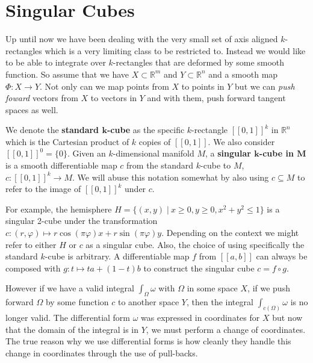 \section{Singular Cubes}

Up until now we have been dealing with the very small set of axis aligned $k$-rectangles 
which is a very limiting class to be restricted to.
Instead we would like to be able to integrate over $k$-rectangles that are deformed by some smooth function.
So assume that we have $X \subset \mathbb{R}^m$ and $Y \subset \mathbb{R}^n$ and a smooth map 
 $\varPhi : X \to Y$.
Not only can we map points from $X$ to points in $Y$ but we can \emph{push foward} vectors from $X$ to vectors in $Y$
and with them, push forward tangent spaces as well.


\begin{definition}
	We denote the \textbf{standard $\boldsymbol{k}$-cube} as the specific $k$-rectangle $[\![0,1]\!]^k$ in 	
	$\mathbb{R}^n$ which is the Cartesian product of $k$ copies of $[\![0,1]\!]$.
	We also consider $[\![0,1]\!]^0 = \{0\}$.
	Given an $k$-dimensional manifold $M$, a \textbf{singular $\boldsymbol{k}$-cube in $\boldsymbol{M}$} is a 
	smooth differentiable map $c$ from the standard $k$-cube to $M$, $c:[\![0,1]\!]^k \to M$.
	We will abuse this notation somewhat by also using $c \subseteq M$ to refer to the image of $[\![0,1]\!]^k$ under $c$.
\end{definition}

For example, the hemisphere $H = \{ (x,y) \; | \: x \geq 0, y\geq 0, x^2+y^2 \leq 1 \}$
is a singular 2-cube under the transformation $c: (r, \varphi) \mapsto r \cos(\pi \varphi) x+ r \sin(\pi \varphi) y$.
Depending on the context we might refer to either $H$ or $c$ as a singular cube.
Also, the choice of using specifically the standard $k$-cube is arbitrary.
A differentiable map $f$ from $[\![a,b]\!]$ can always be composed with $g:t \mapsto ta +(1-t)b$ 
to construct the singular cube $c=f \circ g$.



However if we have a valid integral $\int_{\Omega} \omega$ with $\Omega$ in some space $X$, 
if we push forward $\Omega$ by some function $c$ to another space $Y$, 
then the integral $\int_{c(\Omega)} \omega$ is no longer valid.
The differential form $\omega$ was expressed in coordinates for $X$ but now that the domain of the integral is in $Y$,
we must perform a change of coordinates.
The true reason why we use differential forms is how cleanly they handle this change in coordinates 
through the use of pull-backs.

